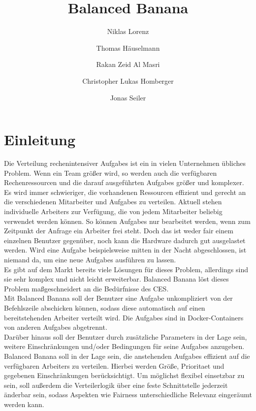\documentclass[a4paper,12pt]{article}
\title{Balanced Banana}
\author{Niklas Lorenz \and Thomas Häuselmann \and Rakan Zeid Al Masri \and Christopher Lukas Homberger \and Jonas Seiler}
\begin{document}
\setcounter{page}{2}
\tableofcontents          %
\clearpage
{}

\section{Einleitung}
\vspace*{1cm}

Die Verteilung rechenintensiver \glspl{Aufgabe} ist ein in vielen Unternehmen übliches Problem. Wenn ein Team größer wird, so werden auch die verfügbaren Rechenressourcen und die darauf ausgeführten \glspl{Aufgabe} größer und komplexer.\\


Es wird immer schwieriger, die vorhandenen Ressourcen effizient und gerecht an die verschiedenen Mitarbeiter und \glspl{Aufgabe} zu verteilen.
Aktuell stehen individuelle \glspl{Arbeiter} zur Verfügung, die von jedem Mitarbeiter beliebig verwendet werden können. So können \glspl{Aufgabe} nur bearbeitet werden, wenn zum Zeitpunkt der Anfrage ein \gls{Arbeiter} frei steht. Doch das ist weder fair einem einzelnen \gls{Benutzer} gegenüber, noch kann die Hardware dadurch gut ausgelastet werden. Wird eine \gls{Aufgabe} beispielsweise mitten in der Nacht abgeschlossen, ist niemand da, um eine neue \glspl{Aufgabe} ausführen zu lassen. \\


Es gibt auf dem Markt bereits viele Lösungen für dieses Problem, allerdings sind sie sehr komplex und nicht leicht erweiterbar.
Balanced Banana löst dieses Problem maßgeschneidert an die Bedürfnisse des CES. \\

Mit Balanced Banana soll der \gls{Benutzer} sine \gls{Aufgabe} unkompliziert von der \gls{Befehlszeile} abschicken können, sodass diese automatisch auf einen bereitstehenden \gls{Arbeiter} verteilt wird. Die \glspl{Aufgabe} sind in \glspl{Docker-Container} von anderen \glspl{Aufgabe} abgetrennt.  \\

Darüber hinaus soll der \gls{Benutzer} durch zusätzliche \glspl{Parameter} in der Lage sein, weitere Einschränkungen und/oder Bedingungen für seine \glspl{Aufgabe} anzugeben.\\

Balanced Banana soll in der Lage sein, die anstehenden \glspl{Aufgabe} effizient auf die verfügbaren \glspl{Arbeiter} zu verteilen. Hierbei werden Größe, \gls{Prioritaet} und gegebenen Einschränkungen berücksichtigt. Um möglichst flexibel einsetzbar zu sein, soll außerdem die Verteilerlogik über eine feste \gls{Schnittstelle} jederzeit änderbar sein, sodass Aspekten wie Fairness unterschiedliche Relevanz eingeräumt werden kann.
\end{document}
